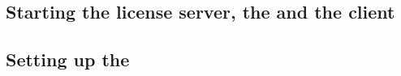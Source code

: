 \subsection{Starting the license server, the \gdserver and the client}


\subsection{Setting up the \gdproject{}}
\label{tutorialsetup}

